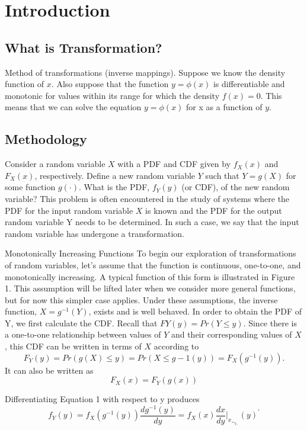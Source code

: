 \documentclass[12pt]{article}
\begin{document}
\section{Introduction}
\subsection{What is Transformation?}
Method of transformations (inverse mappings). Suppose we know the density function of $x$. Also suppose that the function $y =\phi(x)$ is differentiable and monotonic for values within its range for which the density $f(x) =0$.  This means that we can solve the equation $y =\phi(x)$  for x as a function of $y$.
\subsection{Methodology}
Consider a random variable $X$ with a PDF and CDF given by $f_X(x)$ and $F_X(x)$, respectively. Define a new random variable $Y$ such that $Y = g(X)$ for some function $g(·)$. What is the PDF, $f_Y(y)$ (or CDF), of the new random variable? This problem is often encountered in the study of systems where the PDF for the input random variable $X$ is known and the PDF for the output random variable Y needs to be determined. In such a case, we say that the input random variable has undergone a transformation.

Monotonically Increasing Functions To begin our exploration of transformations of random variables, let’s assume that the function is continuous, one-to-one, and monotonically increasing. A typical function of this form is illustrated in Figure 1. This assumption will be lifted later when we consider more general functions, but for now this simpler case applies. Under these assumptions, the inverse function, $X = g^{-1}(Y)$, exists and is well behaved. In order to obtain the PDF of Y, we first calculate the CDF. Recall that $FY(y) = Pr(Y ≤ y)$. Since there is a one-to-one relationship between values of $Y$ and their corresponding values of $X$, this CDF can be written in terms of $X$ according to
\begin{equation}
    F_Y(y)=Pr(g(X)\leq y)=Pr(X\leq g-1(y))=F_X(g^{-1}(y)).
\end{equation}
It can also be written as
\begin{equation}
    F_X(x)=F_Y(g(x))
\end{equation}

Differentiating Equation 1 with respect to y produces
\begin{equation}
 f_Y(y)=f_X(g^{-1}(y))\frac{{dg^{-1}(y)}}{dy}=f_X(x)\frac{dx}{dy}|_x_=_g_^{-1}(y)^{'}
\end{equation}
\end{document}
